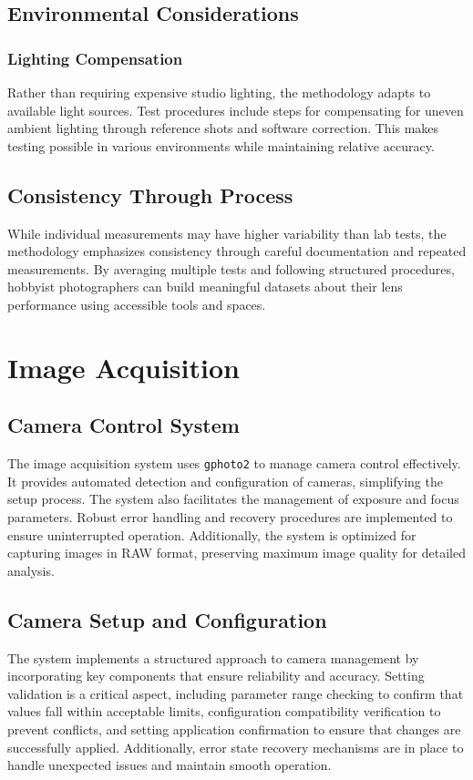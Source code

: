 \subsection{Environmental Considerations}

\subsubsection{Lighting Compensation}
Rather than requiring expensive studio lighting, the methodology adapts to available light sources. Test procedures include steps for compensating for uneven ambient lighting through reference shots and software correction. This makes testing possible in various environments while maintaining relative accuracy.

\subsection{Consistency Through Process} %
While individual measurements may have higher variability than lab tests, the methodology emphasizes consistency through careful documentation and repeated measurements. By averaging multiple tests and following structured procedures, hobbyist photographers can build meaningful datasets about their lens performance using accessible tools and spaces.

\section{Image Acquisition}

\subsection{Camera Control System}
The image acquisition system uses \texttt{gphoto2} to manage camera control effectively. It provides automated detection and configuration of cameras, simplifying the setup process. The system also facilitates the management of exposure and focus parameters. Robust error handling and recovery procedures are implemented to ensure uninterrupted operation. Additionally, the system is optimized for capturing images in RAW format, preserving maximum image quality for detailed analysis.

\subsection{Camera Setup and Configuration}
The system implements a structured approach to camera management by incorporating key components that ensure reliability and accuracy. Setting validation is a critical aspect, including parameter range checking to confirm that values fall within acceptable limits, configuration compatibility verification to prevent conflicts, and setting application confirmation to ensure that changes are successfully applied. Additionally, error state recovery mechanisms are in place to handle unexpected issues and maintain smooth operation.

